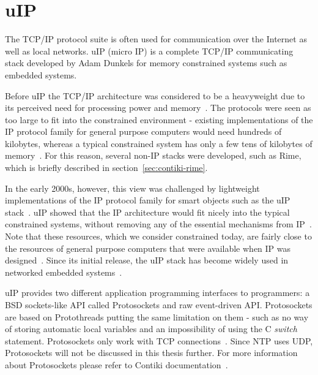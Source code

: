 
\section{uIP}\label{sec:contiki-uip}
The TCP/IP protocol suite is often used for communication over the Internet as well as local networks.
uIP (micro IP) is a complete TCP/IP communicating stack developed by Adam Dunkels
for memory constrained systems such as embedded systems.

Before uIP the TCP/IP architecture was considered to be a heavyweight
due to its perceived need for processing power and memory~\cite{interconnecting}.
The protocols were seen as too large to fit into the constrained environment -
existing implementations of the IP protocol family for general purpose computers would need hundreds
of kilobytes, whereas a typical constrained system has only a few tens of kilobytes of memory~\cite{interconnecting}.
For this reason, several non-IP stacks were developed,
such as Rime, which is briefly described in section~\ref{sec:contiki-rime}.

In the early 2000s, however, this view was challenged by lightweight implementations of the IP
protocol family for smart objects such as the uIP stack~\cite{interconnecting}.
uIP showed that the IP architecture would fit nicely into the typical constrained systems,
without removing any of the essential mechanisms from IP~\cite{interconnecting}.
Note that these resources, which we consider constrained today, are fairly close to the
resources of general purpose computers that were available when IP was designed~\cite{interconnecting}.
Since its initial release, the uIP stack has become widely used in networked
embedded systems~\cite{interconnecting, thesis-programming}.

uIP provides two different application programming interfaces to programmers:
a BSD sockets-like API called Protosockets and raw event-driven API.
Protosockets are based on Protothreads putting the same limitation on them - such as 
no way of storing automatic local variables and an impossibility of using the C {\it switch} statement.
Protosockets only work with TCP connections~\cite{contiki-docs}.
Since NTP uses UDP, Protosockets will not be
discussed in this thesis further. For more information about Protosockets
please refer to Contiki documentation~\cite{contiki-docs}.

